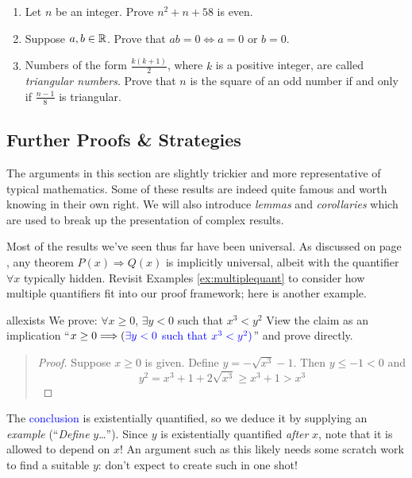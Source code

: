 \begin{exercises}{}{}
\begin{enumerate}
    
    \item Let $n$ be an integer. Prove $n^2+n+58$ is even. 

  
		\item\label{exs:zerofactor} Suppose $a,b\in\mathbb{R}$. Prove that $ab=0\iff a=0$ or $b=0$.
  
    
    \item Numbers of the form $\frac{k(k + 1)}{2}$, where $k$ is a positive integer, are called \emph{triangular numbers}. Prove that $n$ is the square of an odd number if and only if $\frac{n-1}{8}$ is triangular.
         
	\end{enumerate}
\end{exercises}


\clearpage




\subsection{Further Proofs \& Strategies}\label{sec:proof2}


The arguments in this section are slightly trickier and more representative of typical mathematics. Some of these results are indeed quite famous and worth knowing in their own right. We will also introduce \emph{lemmas} and \emph{corollaries} which are used to break up the presentation of complex results.



Most of the results we've seen thus far have been universal. As discussed on page \pageref{pg:univproof}, any theorem $P(x)\Longrightarrow Q(x)$ is implicitly universal, albeit with the quantifier $\forall x$ typically hidden. Revisit Examples \ref{ex:multiplequant} to consider how multiple quantifiers fit into our proof framework; here is another example.

\begin{example}{}{allexists}
	We prove: $\forall x\ge 0$, $\exists y<0$ such that $x^3<y^2$\medbreak
	View the claim as an implication ``$x\ge 0\Longrightarrow (\textcolor{blue}{\exists y<0}$ \textcolor{blue}{such that} $\textcolor{blue}{x^3<y^2)}$'' and prove directly.
	\begin{quote}
		\begin{proof}
			Suppose $x\ge 0$ is given. Define $y=-\sqrt{x^3}-1$. Then $y\le -1<0$ and 
			\[
				y^2=x^3+1+2\sqrt{x^3}\ge x^3+1>x^3 \tag*{\qedhere}
			\]
		\end{proof}
	\end{quote}
	The \textcolor{blue}{conclusion} is existentially quantified, so we deduce it by supplying an \emph{example} (``\emph{Define} $y$\ldots''). Since $y$ is existentially quantified \emph{after} $x$, note that it is allowed to depend on $x$!	An argument such as this likely needs some scratch work to find a suitable $y$: don't expect to create such in one shot!
\end{example}



